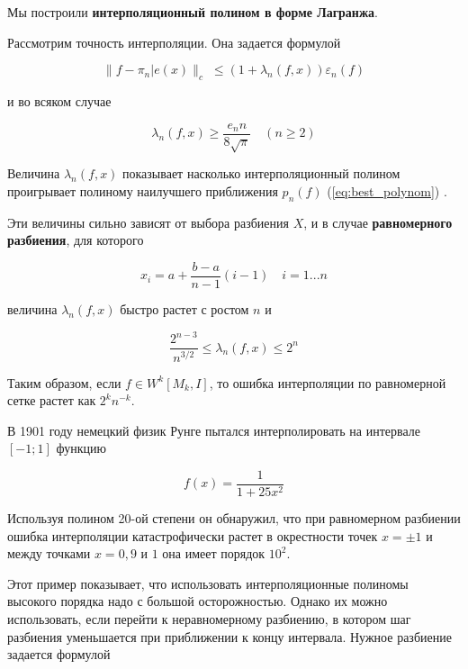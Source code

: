 Мы построили \textbf{интерполяционный полином в форме Лагранжа}. 

Рассмотрим точность интерполяции. Она задается формулой 

\begin{equation}
\parallel f - \pi_n| e(x) \parallel_c \; \leq (1+ \lambda_n(f, x))\varepsilon_n(f)
\end{equation}

и во всяком случае 

\begin{equation}
\lambda_n(f, x) \geq \frac{e_n n}{8 \sqrt{\pi}} \quad (n \geq 2)
\end{equation}

Величина $\lambda_n(f, x)$ показывает насколько интерполяционный полином проигрывает полиному наилучшего приближения $p_n(f)$ (\ref{eq:best_polynom}) .


Эти величины сильно зависят от выбора разбиения $X$, и в случае \textbf{равномерного разбиения}, для которого

\begin{equation} \label{eq:2.24}
x_i = a + \frac{b-a}{n-1}(i-1) \quad i = 1...n
\end{equation}

величина $\lambda_n(f, x)$ быстро растет с ростом $n$ и


\begin{equation}
\frac{2^{n-3}}{n^{3/2}} \leq \lambda_n(f, x) \leq 2^n
\end{equation} 


Таким образом, если  $f \in W^k[M_k, I]$, то ошибка интерполяции по равномерной сетке растет как $2^kn^{-k}$.

В 1901 году немецкий физик Рунге пытался интерполировать на интервале $[-1; 1]$ функцию

\begin{equation}
f(x) = \frac{1}{1+25x^2}
\end{equation}

Используя полином 20-ой степени он обнаружил, что при равномерном разбиении ошибка интерполяции катастрофически растет в окрестности точек $x = \pm 1$ и между точками $x = 0,9$ и $1$ она имеет порядок $10^2$.

Этот пример показывает, что использовать интерполяционные полиномы высокого порядка надо с большой осторожностью. Однако их можно использовать, если перейти к неравномерному разбиению, в котором шаг разбиения уменьшается при приближении к концу интервала.
Нужное разбиение задается формулой 

